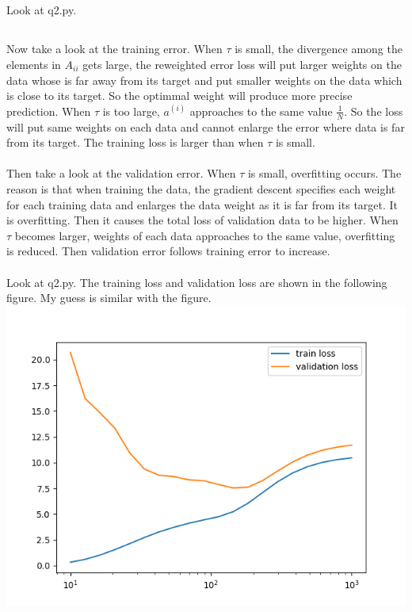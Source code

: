 \documentclass{article}
\begin{document}
\subsection{}
Look at q2.py.
\subsection{}
Now take a look at the training error. When $\tau$ is small, the divergence among the elements in $A_{ii}$ gets large, the reweighted error loss will put larger weights on the data whose is far away from its target and put smaller weights on the data which is close to its target. So the optimmal weight will produce more precise prediction.  When $\tau$ is too large, $a^{(i)}$ approaches to the same value $\frac{1}{N}$. So the loss will put same weights on each data and cannot enlarge the error where data is far from its target. The training loss is larger than when $\tau$ is small.\\\\
Then take a look at the validation error. When $\tau$ is small, overfitting occurs. The reason is that when training the data, the gradient descent specifies each weight for each training data and enlarges the data weight as it is far from its target. It is overfitting. Then it causes the total loss of validation data to be higher. When $\tau$ becomes larger, weights of each data approaches to the same value, overfitting is reduced. Then validation error follows training error to increase.\\\\
Look at q2.py. The training loss and validation loss are shown in the following figure. My guess is similar with the figure.\\
\includegraphics{q2c.png}
\end{document}
